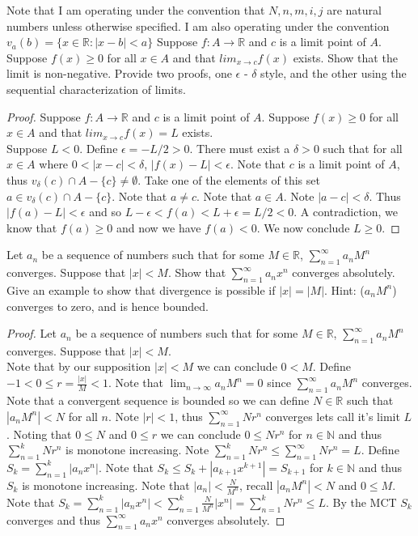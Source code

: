 \documentclass[12pt]{article}
\makeatletter
\theoremstyle{homework}
\newenvironment{exercise}[1]
{\def\@currentlabel{#1}\exercisecore}
{\endexercisecore}
\makeatother
\begin{document}
Note that I am operating under the convention that $N,n,m,i,j$ are natural numbers unless otherwise specified.  I am also operating under the convention $v_a(b)=\{x\in\mathbb{R}:|x-b|<a\}$
\begin{exercise}
1
Suppose $f : A \rightarrow \mathbb{R}$ and $c$ is a limit point of $A$. Suppose $f (x) \geq 0$ for all $x \in A$ and that
$lim_{x \rightarrow c}f (x)$ exists. Show that the limit is non-negative. Provide two proofs, one $\epsilon$ - $\delta$
style, and the other using the sequential characterization of limits.
\end{exercise}
\begin{proof}
Suppose $f : A \rightarrow \mathbb{R}$ and $c$ is a limit point of $A$. Suppose $f (x) \geq 0$ for all $x \in A$ and that
$lim_{x \rightarrow c}f (x)=L$ exists.\\
Suppose $L<0$.  Define $\epsilon=-L/2>0$.  There must exist a $\delta>0$ such that for all $x\in A$ where $0<|x-c|<\delta$, $|f(x)-L|<\epsilon$.  Note that $c$ is a limit point of $A$, thus $v_\delta(c)\cap A-\{c\}\neq \emptyset$.  Take one of the elements of this set $a\in v_\delta(c)\cap A-\{c\}$.  Note that $a\neq c$.  Note that $a\in A$.  Note $|a-c|<\delta$.  Thus $|f(a)-L|<\epsilon$ and so $L-\epsilon<f(a)<L+\epsilon=L/2<0$.  A contradiction, we know that $f(a)\geq 0$ and now we have $f(a)<0$.  We now conclude $L\geq 0$.
\end{proof}
\begin{exercise} 2
Let $a_n$ be a sequence of numbers such that for some $M \in \mathbb{R}$, $\sum^\infty_{n=1} a_nM^n$ converges. Suppose
that $|x| < M$. Show that $\sum^\infty_{n=1} a_nx^n$ converges absolutely. Give an example to show
that divergence is possible if $|x| = |M|$. Hint: ($a_nM^n$) converges to zero, and is hence
bounded.
\end{exercise}
\begin{proof}
Let $a_n$ be a sequence of numbers such that for some $M \in \mathbb{R}$, $\sum^\infty_{n=1} a_nM^n$ converges. Suppose
that $|x| < M$.\\
Note that by our supposition $|x| < M$ we can conclude $0< M$.  Define $-1<0\leq r=\frac{|x|}{M}<1$.  Note that $\lim_{n\rightarrow \infty} a_nM^n=0$ since $\sum^\infty_{n=1} a_nM^n$ converges.  Note that a convergent sequence is bounded so we can define $N\in\mathbb{R}$ such that $|a_nM^n|<N$ for all $n$.  Note $|r|<1$, thus $\sum_{n=1}^\infty N r^n$ converges lets call it's limit $L$.  Noting that $0\leq N$ and $0\leq r$ we can conclude $0\leq N r^n$ for $n\in\mathbb{N}$ and thus $\sum_{n=1}^k N r^n$ is monotone increasing.  Note $\sum_{n=1}^k N r^n\leq \sum_{n=1}^\infty N r^n=L$.  Define $S_k=\sum^k_{n=1} |a_nx^n|$.  Note that $S_k\leq S_k+|a_{k+1}x^{k+1}|=S_{k+1}$ for $k\in\mathbb{N}$ and thus $S_k$ is monotone increasing.  Note that $|a_n|<\frac{N}{M^n}$, recall $|a_nM^n|<N$ and $0\leq M$.  Note that $S_k=\sum^k_{n=1} |a_nx^n|<\sum^k_{n=1} \frac{N}{M^n}|x^n|=\sum^k_{n=1} N r^n\leq L$.  By the MCT $S_k$ converges and thus $\sum^\infty_{n=1} a_nx^n$ converges absolutely.

\end{proof}
\end{document}
